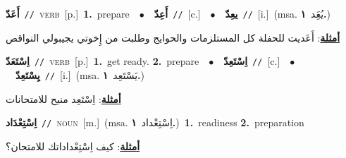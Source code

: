 \documentclass[10pt,a4paper,twoside]{article} %
\begin{document}
\begin{multicols}{2}
{\setlength\topsep{0pt}\textbf{\foreignlanguage{arabic}{أَعَدّ}}\ {\color{gray}\texttt{//}\color{black}}\ \textsc{verb}\ [p.]\ \textbf{1.}~prepare\ \ $\bullet$\ \ \setlength\topsep{0pt}\textbf{\foreignlanguage{arabic}{أَعِدّ}}\ {\color{gray}\texttt{//}\color{black}}\ [c.]\ \ $\bullet$\ \ \setlength\topsep{0pt}\textbf{\foreignlanguage{arabic}{يعِدّ}}\ {\color{gray}\texttt{//}\color{black}}\ [i.]\ \color{gray}(msa. \foreignlanguage{arabic}{يُعَِد}~\foreignlanguage{arabic}{\textbf{١.}})\color{black}\  \begin{flushright}\color{gray}\foreignlanguage{arabic}{\textbf{\underline{\foreignlanguage{arabic}{أمثلة}}}: أَعَديت للحفلة كل المستلزمات والحوايج وطلبت من إِخوتي يجيبولي النواقص}\end{flushright}\color{black}} \vspace{2mm}

{\setlength\topsep{0pt}\textbf{\foreignlanguage{arabic}{اِسْتَعَدّ}}\ {\color{gray}\texttt{//}\color{black}}\ \textsc{verb}\ [p.]\ \textbf{1.}~get ready.  \textbf{2.}~prepare\ \ $\bullet$\ \ \setlength\topsep{0pt}\textbf{\foreignlanguage{arabic}{اِسْتَعِدّ}}\ {\color{gray}\texttt{//}\color{black}}\ [c.]\ \ $\bullet$\ \ \setlength\topsep{0pt}\textbf{\foreignlanguage{arabic}{يِسْتَعِدّ}}\ {\color{gray}\texttt{//}\color{black}}\ [i.]\ \color{gray}(msa. \foreignlanguage{arabic}{يَسْتَعِد}~\foreignlanguage{arabic}{\textbf{١.}})\color{black}\  \begin{flushright}\color{gray}\foreignlanguage{arabic}{\textbf{\underline{\foreignlanguage{arabic}{أمثلة}}}: اِسْتَعِد منيح للامتحانات}\end{flushright}\color{black}} \vspace{2mm}

{\setlength\topsep{0pt}\textbf{\foreignlanguage{arabic}{اِسْتِعْدَاد}}\ {\color{gray}\texttt{//}\color{black}}\ \textsc{noun}\ [m.]\ \color{gray}(msa. \foreignlanguage{arabic}{اِسْتِعْداد}~\foreignlanguage{arabic}{\textbf{١.}})\color{black}\ \textbf{1.}~readiness  \textbf{2.}~preparation\  \begin{flushright}\color{gray}\foreignlanguage{arabic}{\textbf{\underline{\foreignlanguage{arabic}{أمثلة}}}: كيف اِسْتِعْداداتك للامتحان؟}\end{flushright}\color{black}} \vspace{2mm}


\end{multicols}
\end{document}
